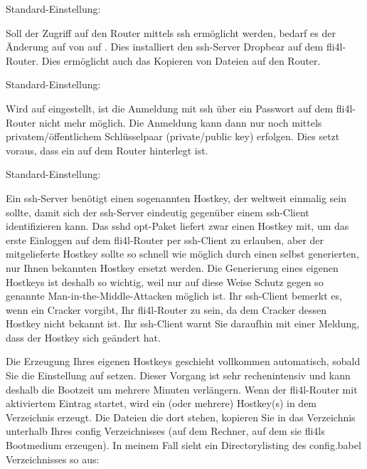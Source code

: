 \begin{description}


  Standard-Einstellung: 

  Soll der Zugriff auf den Router mittels ssh ermöglicht werden, bedarf es
  der Änderung auf von  auf . Dies installiert den
  ssh-Server Dropbear auf dem fli4l-Router. Dies ermöglicht auch das Kopieren
  von Dateien auf den Router.


  Standard-Einstellung: 

  Wird  auf  eingestellt, ist die
  Anmeldung mit ssh über ein Passwort auf dem fli4l-Router nicht mehr
  möglich. Die Anmeldung kann dann nur noch mittels privatem/öffentlichem
  Schlüsselpaar (private/public key) erfolgen. Dies setzt voraus, dass ein
   auf dem Router hinterlegt ist.


  Standard-Einstellung: 

  Ein ssh-Server benötigt einen sogenannten Hostkey, der weltweit
  einmalig sein sollte, damit sich der ssh-Server eindeutig gegenüber
  einem ssh-Client identifizieren kann. Das sshd opt-Paket liefert
  zwar einen Hostkey mit, um das erste Einloggen auf dem fli4l-Router
  per ssh-Client zu erlauben, aber der mitgelieferte Hostkey sollte so
  schnell wie möglich durch einen selbst generierten, nur Ihnen bekannten
  Hostkey ersetzt werden.
  Die Generierung eines eigenen Hostkeys ist deshalb so wichtig, weil
  nur auf diese Weise Schutz gegen so genannte Man-in-the-Middle-Attacken
  möglich ist. Ihr ssh-Client bemerkt es, wenn ein Cracker vorgibt, Ihr
  fli4l-Router zu sein, da dem Cracker dessen Hostkey nicht bekannt ist. Ihr
  ssh-Client warnt Sie daraufhin mit einer Meldung, dass der Hostkey sich
  geändert hat.

  Die Erzeugung Ihres eigenen Hostkeys geschieht vollkommen automatisch, sobald
  Sie die Einstellung  auf  setzen. Dieser
  Vorgang ist sehr rechenintensiv und kann deshalb die Bootzeit um mehrere
  Minuten verlängern.  Wenn der fli4l-Router mit aktiviertem
   Eintrag startet, wird ein (oder mehrere)
  Hostkey(s) in dem Verzeichnis  erzeugt.  Die Dateien die dort
  stehen, kopieren Sie in das Verzeichnis  unterhalb Ihres config
  Verzeichnisses (auf dem Rechner, auf dem sie fli4ls Bootmedium erzeugen). 
  In meinem Fall sieht ein Directorylisting des config.babel
  Verzeichnisses so aus:


\end{description}
